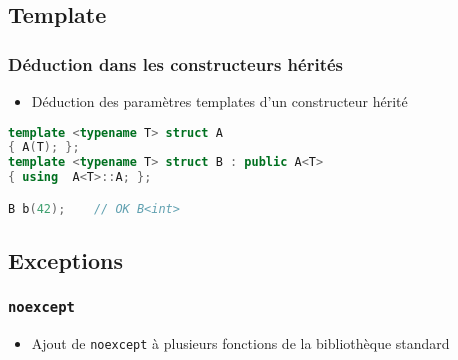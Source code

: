 \documentclass[C++.tex]{subfiles}
\begin{document}
\subsection*{Template}
\begin{frame}[fragile]
	\frametitle{Déduction dans les constructeurs hérités}
	\begin{itemize}
		\item Déduction des paramètres templates d'un constructeur hérité
	\end{itemize}

	\begin{lstlisting}[language=C++]
template <typename T> struct A
{ A(T); };
template <typename T> struct B : public A<T>
{ using  A<T>::A; };

B b(42);	// OK B<int>\end{lstlisting}
\end{frame}

\subsection*{Exceptions}
\begin{frame}[fragile]
	\frametitle{\lstinline|noexcept|}
	\begin{itemize}
		\item Ajout de \lstinline|noexcept| à plusieurs fonctions de la bibliothèque standard
	\end{itemize}
\end{frame}
\end{document}
